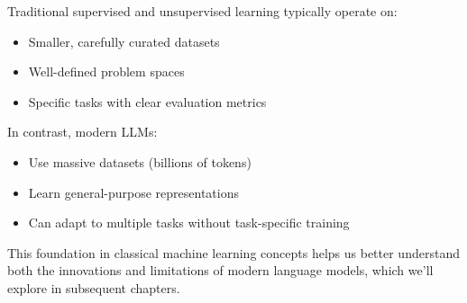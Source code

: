 Traditional supervised and unsupervised learning typically operate on:
\begin{itemize}[noitemsep]
    \item Smaller, carefully curated datasets
    \item Well-defined problem spaces
    \item Specific tasks with clear evaluation metrics
\end{itemize}

In contrast, modern LLMs:
\begin{itemize}[noitemsep]
    \item Use massive datasets (billions of tokens)
    \item Learn general-purpose representations
    \item Can adapt to multiple tasks without task-specific training
\end{itemize}

This foundation in classical machine learning concepts helps us better understand both the innovations and limitations of modern language models, which we'll explore in subsequent chapters. 